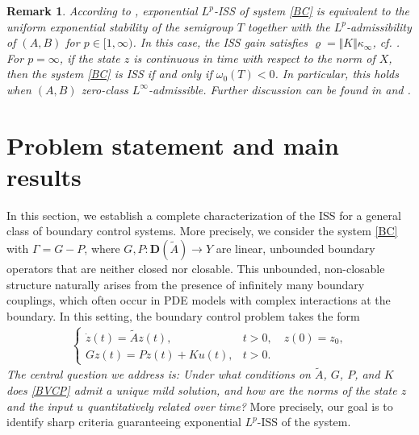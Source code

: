 \documentclass[onecolumn]{autart}
\newtheorem{remark}{Remark}[section]
\numberwithin{equation}{section}
\begin{document}
	\begin{remark}\label{Remark-ISS}
		According to \cite[Prop. 2.10]{JaNPS}, exponential $L^p$-ISS of system \eqref{BC} is equivalent to the uniform exponential stability of the semigroup $T$ together with the $L^p$-admissibility of $(A,B)$ for $p \in [1,\infty)$. In this case, the ISS gain satisfies $\varrho = \Vert K\Vert \kappa_\infty$, cf. \cite[Rem. 2.12]{JaNPS}. For $p=\infty$, if the state $z$ is continuous in time with respect to the norm of $X$, then the system \eqref{BC} is ISS if and only if $\omega_0(T)<0$. In particular, this holds when $(A,B)$ zero-class $L^\infty$-admissible. Further discussion can be found in \cite[Sec. 2]{JaNPS} and \cite[Sec. 3.2]{Andri}.
	\end{remark}
	
	\section{Problem statement and main results}\label{Sec:2.3}
	In this section, we establish a complete characterization of the ISS for a general class of boundary control systems. More precisely, we consider the system \eqref{BC} with $\Gamma = G-P$, where $G,P:{\bm D}(\tilde{A}) \to Y$ are linear, unbounded boundary operators that are neither closed nor closable. This unbounded, non-closable structure naturally arises from the presence of infinitely many boundary couplings, which often occur in PDE models with complex interactions at the boundary. In this setting, the boundary control problem takes the form
    	\begin{align}\label{BVCP}
		\begin{cases}
			\dot{z}(t) = \tilde{A} z(t), & t > 0, \quad z(0)=z_0, \\
			G z(t) = P z(t) + K u(t), & t > 0.
		\end{cases}
	\end{align}
	\emph{The central question we address is: Under what conditions on $\tilde{A}$, $G$, $P$, and $K$ does \eqref{BVCP} admit a unique mild solution, and how are the norms of the state $z$ and the input $u$ quantitatively related over time?} More precisely, our goal is to identify sharp criteria guaranteeing exponential $L^p$-ISS of the system.

	
\end{document}
